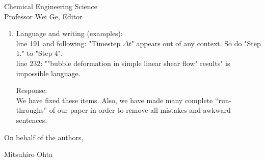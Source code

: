 \documentclass{letter}
\begin{document}
\begin{letter}{
Chemical Engineering Science\\
Professor Wei Ge, Editor\\}
\begin{enumerate}
Response: \\
We totally disagree that not including gravity ``obliterates'' the results.

At the least, there are a host of strictly microgravity applications in which our research will be of great help.   We list many new applications, including the microgravity applications, in the revised version: please see the first paragraph in the introduction.  All these applications that we list will significantly benefit from our article.  

We have also added a discussion at the end of section 2 (see the ``Remark'') in which we make some predictions as to how the inclusion of gravity would change the results.

Having said that, we do agree that taking into account the gravity effects and initial condition effects will make good material for future work.  Please see the last paragraph in our modified conclusion.

\\

\par\noindent
\item
\textsf
{Language and writing (examples):\\
line 191 and following: "Timestep $\Delta t$" appears out of any context. So do "Step 1." to "Step 4".\\
line 232: ""bubble deformation in simple linear shear flow" results" is impossible language. \\}
\vspace{3 mm}

Response: \\
We have fixed these items.  Also, we have made many complete ``run-throughs'' of our paper in order to remove all mistakes and awkward sentences.

\end{enumerate}

\closing{On behalf of the authors,}
Mitsuhiro Ohta

\end{letter}
\end{document}
